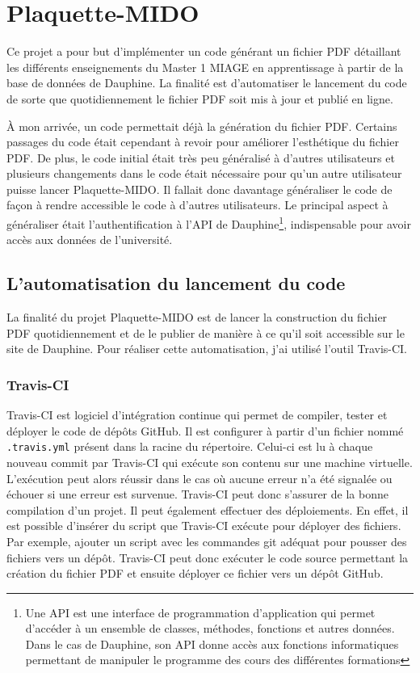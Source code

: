 \chapter[Plaquette-MIDO]{Plaquette-MIDO\raisebox{.3\baselineskip}{\normalsize\footnotemark}}

Ce projet a pour but d'implémenter un code générant un fichier PDF détaillant les différents enseignements du Master 1 MIAGE en apprentissage à partir de la base de données de Dauphine. La finalité est d'automatiser le lancement du code de sorte que quotidiennement le fichier PDF soit mis à jour et publié en ligne.

À mon arrivée, un code permettait déjà la génération du fichier PDF. Certains passages du code était cependant à revoir pour améliorer l'esthétique du fichier PDF. De plus, le code initial était très peu généralisé à d'autres utilisateurs et plusieurs changements dans le code était nécessaire pour qu'un autre utilisateur puisse lancer Plaquette-MIDO. Il fallait donc davantage généraliser le code de façon à rendre accessible le code à d'autres utilisateurs. Le principal aspect à généraliser était l'authentification à l'API de Dauphine\footnote{Une API est une interface de programmation d’application qui permet d'accéder à un ensemble de classes, méthodes, fonctions et autres données. Dans le cas de Dauphine, son API donne accès aux fonctions informatiques permettant de manipuler le programme des cours des différentes formations}, indispensable pour avoir accès aux données de l'université.

\section{L'automatisation du lancement du code}

La finalité du projet Plaquette-MIDO est de lancer la construction du fichier PDF quotidiennement et de le publier de manière à ce qu'il soit accessible sur le site de Dauphine. Pour réaliser cette automatisation, j'ai utilisé l'outil Travis-CI.

\subsection{Travis-CI}
    Travis-CI est logiciel d'intégration continue qui permet de compiler,
    tester et déployer le code de dépôts GitHub. Il est configurer à partir
    d'un fichier nommé \texttt{.travis.yml} présent dans la racine du
    répertoire. Celui-ci est lu à chaque nouveau commit par Travis-CI qui
    exécute son contenu sur une machine virtuelle. L'exécution peut alors
    réussir dans le cas où aucune erreur n'a été signalée ou échouer si une
    erreur est survenue. Travis-CI peut donc s'assurer de la bonne
    compilation d'un projet. Il peut également effectuer des déploiements.
    En effet, il est possible d'insérer du script que Travis-CI exécute pour
    déployer des fichiers. Par exemple, ajouter un script avec les commandes
    git adéquat pour pousser des fichiers vers un dépôt. Travis-CI peut donc
    exécuter le code source permettant la création du fichier PDF et ensuite
    déployer ce fichier vers un dépôt GitHub.


